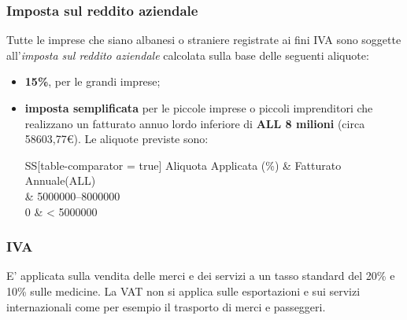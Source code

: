 \subsubsection{Imposta sul reddito aziendale} 
Tutte le imprese che siano albanesi o straniere registrate ai fini \ac{IVA} sono soggette all'\textit{imposta sul reddito aziendale} calcolata sulla base delle seguenti aliquote:
\begin{itemize}
	\item \textbf{15\%}, per le grandi imprese;
	\item \textbf{imposta semplificata} per le piccole imprese o piccoli imprenditori che realizzano un fatturato annuo lordo inferiore di \textbf{ALL 8 milioni} (circa 58603,77\euro). Le aliquote previste sono:
		\begin{center}
 			\begin{tabular}{SS[table-comparator = true]}
 			\toprule 
 				{Aliquota Applicata (\%)} & {Fatturato Annuale(ALL)} \\
 			 & \numrange{5000000}{8000000} \\
 				0 & < 5000000 \\
 			\bottomrule
 			\end{tabular} 
		\end{center}
\end{itemize} 
\subsubsection{IVA}
E' applicata sulla vendita delle merci e dei servizi a un tasso standard del 20\% e 10\% sulle medicine. La VAT non si applica sulle
esportazioni e sui servizi internazionali come per esempio il trasporto di merci e passeggeri.
